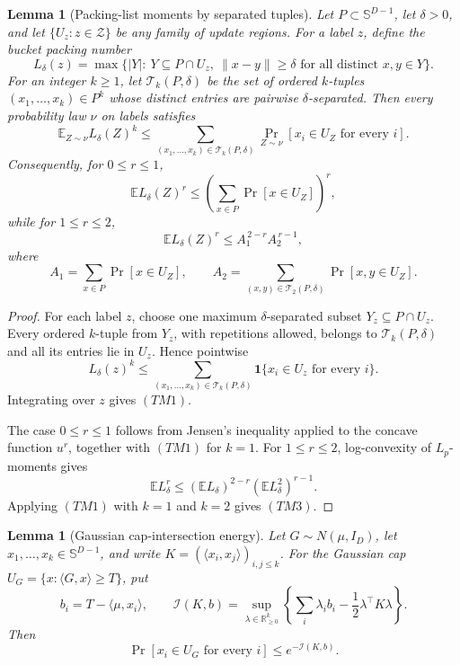 \documentclass[10pt]{article}
\newtheorem{lemma}[theorem]{Lemma}
\theoremstyle{definition}
\newcommand{\E}{\mathbb{E}}
\newcommand{\ip}[2]{\langle #1,#2\rangle}
\begin{document}
\begin{lemma}[Packing-list moments by separated tuples]
   \label{lem:packing-list-tuple-moment}
   Let \(P\subset\mathbb S^{D-1}\), let \(\delta>0\), and let
   \(\{U_z:z\in\mathcal Z\}\) be any family of update regions.  For a label
   \(z\), define the bucket packing number
   \[
      L_\delta(z)=
      \max\{|Y|:\ Y\subseteq P\cap U_z,\ \|x-y\|\ge\delta
      \text{ for all distinct }x,y\in Y\}.
   \]
   For an integer \(k\ge1\), let \(\mathcal T_k(P,\delta)\) be the set of
   ordered \(k\)-tuples \((x_1,\ldots,x_k)\in P^k\) whose distinct entries are
   pairwise \(\delta\)-separated.  Then every probability law \(\nu\) on
   labels satisfies
   \[
      \E_{Z\sim\nu} L_\delta(Z)^k
      \le
      \sum_{(x_1,\ldots,x_k)\in\mathcal T_k(P,\delta)}
      \Pr_{Z\sim\nu}[x_i\in U_Z\text{ for every }i].
      \tag{TM1}
   \]
   Consequently, for \(0\le r\le1\),
   \[
      \E L_\delta(Z)^r
      \le
      \left(
      \sum_{x\in P}\Pr[x\in U_Z]
      \right)^r,
      \tag{TM2}
   \]
   while for \(1\le r\le2\),
   \[
      \E L_\delta(Z)^r
      \le
      A_1^{\,2-r}A_2^{\,r-1},
      \tag{TM3}
   \]
   where
   \[
      A_1=\sum_{x\in P}\Pr[x\in U_Z],
      \qquad
      A_2=
      \sum_{(x,y)\in\mathcal T_2(P,\delta)}
      \Pr[x,y\in U_Z].
   \]
\end{lemma}

\begin{proof}
   For each label \(z\), choose one maximum \(\delta\)-separated subset
   \(Y_z\subseteq P\cap U_z\).  Every ordered \(k\)-tuple from \(Y_z\), with
   repetitions allowed, belongs to \(\mathcal T_k(P,\delta)\) and all its
   entries lie in \(U_z\).  Hence
   pointwise
   \[
      L_\delta(z)^k
      \le
      \sum_{(x_1,\ldots,x_k)\in\mathcal T_k(P,\delta)}
      \mathbf 1\{x_i\in U_z\text{ for every }i\}.
   \]
   Integrating over \(z\) gives \((TM1)\).

   The case \(0\le r\le1\) follows from Jensen's inequality applied to the
   concave function \(u^r\), together with \((TM1)\) for \(k=1\).  For
   \(1\le r\le2\), log-convexity of \(L_p\)-moments gives
   \[
      \E L_\delta^r
      \le
      (\E L_\delta)^{2-r}(\E L_\delta^2)^{r-1}.
   \]
   Applying \((TM1)\) with \(k=1\) and \(k=2\) gives \((TM3)\).
\end{proof}

\begin{lemma}[Gaussian cap-intersection energy]
   \label{lem:gaussian-cap-intersection-energy}
   Let \(G\sim N(\mu,I_D)\), let \(x_1,\ldots,x_k\in\mathbb S^{D-1}\), and
   write \(K=(\ip{x_i}{x_j})_{i,j\le k}\).  For the Gaussian cap
   \(U_G=\{x:\ip{G}{x}\ge T\}\), put
   \[
      b_i=T-\ip{\mu}{x_i},
      \qquad
      \mathcal I(K,b)=
      \sup_{\lambda\in\mathbb R_{\ge0}^k}
      \left\{
         \sum_i\lambda_i b_i
         -
         \frac12\lambda^\top K\lambda
      \right\}.
      \tag{GE1}
   \]
   Then
   \[
      \Pr[x_i\in U_G\text{ for every }i]
      \le
      e^{-\mathcal I(K,b)}.
      \tag{GE2}
   \]
\end{lemma}
\end{document}
